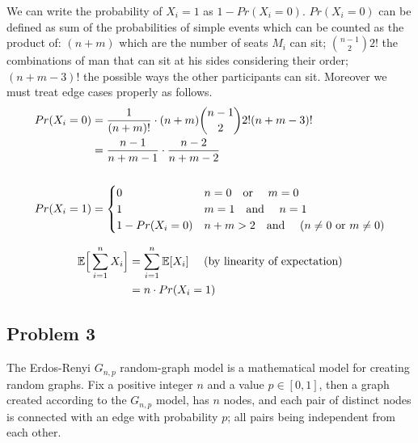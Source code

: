 \documentclass[a4paper]{article}
\begin{document}
\begin{enumerate}
    \fi
    We can write the probability of $X_i = 1$ as $1-Pr(X_i = 0)$. $Pr(X_i = 0)$ can be defined as sum of the probabilities of simple events which can be counted as the product of: $(n + m)$ which are the number of seats $M_i$ can sit; $\binom{n-1}{2}2!$ the combinations of man that can sit at his sides considering their order; $(n+m-3)!$ the possible ways the other participants can sit. Moreover we must treat edge cases properly as follows.
    \begin{align*}
        Pr(X_i = 0) &= \frac{1}{(n + m)!} \cdot (n+m)\binom{n-1}{2}2!(n+m-3)! \\
                &= \frac{n-1}{n+m-1} \cdot \frac{n-2}{n+m-2} \\ \\
        Pr(X_i = 1) &=
        \begin{cases}
            0 & n = 0 \text{\quad or \quad} m = 0\\
            1 & m = 1 \text{\quad and \quad} n = 1 \\
            1 - Pr(X_i = 0) & n + m > 2 \text{\quad and \quad} (n \neq 0 \text{ or } m \neq 0)\\
        \end{cases}
    \end{align*}

    \begin{align*}
        \mathbb{E}\Big[\sum_{i = 1}^{n} X_i \Big] &= \sum_{i = 1}^{n} \mathbb{E}[X_i] \text{ \quad(by linearity of expectation)} \\
        &= n\cdot Pr(X_i = 1)
    \end{align*}
\end{enumerate}

\subsection*{Problem 3}

The Erdos-Renyi $G_{n,p}$ random-graph model is a mathematical model for creating
random graphs. Fix a positive integer $n$ and a value $p \in [0, 1]$, then a graph created according
to the $G_{n,p}$ model, has $n$ nodes, and each pair of distinct nodes is connected with an edge with
probability $p$; all pairs being independent from each other.
\end{document}
